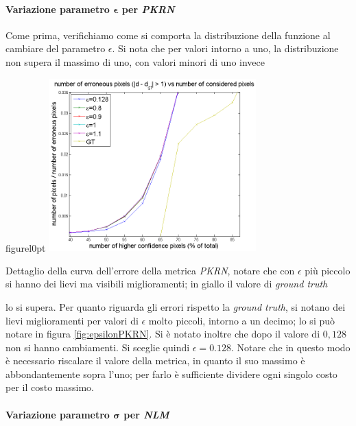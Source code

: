 \documentclass[12pt]{report}
\begin{document}
			\paragraph{Variazione parametro $\bm{\epsilon}$ per \textit{PKRN}}
			\label{par:epsilon}
		
				Come prima, verifichiamo come si comporta la distribuzione della funzione al cambiare del parametro $\epsilon$. Si nota che per valori intorno a uno, la distribuzione non supera il massimo di uno, con valori minori di uno invece
			
				\begin{wrapfloat}{figure}{l}{0pt}
					\includegraphics[width=0.6\textwidth]{./figures/epsilon_PKRN.png}
					\caption{Dettaglio della curva dell'errore della metrica \textit{PKRN}, notare che con $\epsilon$ più piccolo si hanno dei lievi ma visibili miglioramenti; in giallo il valore di \textit{ground truth}}
					\label{fig:epsilonPKRN}
				\end{wrapfloat} 
			
			
				\noindent lo si supera. Per quanto riguarda gli errori rispetto la \textit{ground truth}, si notano dei lievi miglioramenti per valori di $\epsilon$ molto piccoli, intorno a un decimo; lo si può notare in figura \ref{fig:epsilonPKRN}. Si è notato inoltre che dopo il valore di $0,128$ non si hanno cambiamenti. Si sceglie quindi $\epsilon=0.128$. Notare che in questo modo è necessario riscalare il valore della metrica, in quanto il suo massimo è abbondantemente sopra l'uno; per farlo è sufficiente dividere ogni singolo costo per il costo massimo. \newline \newline \newline
	
			\paragraph{Variazione parametro $\bm{\sigma}$ per \textit{NLM}}
			\label{par:sigmaNLM}
			
\end{document}
